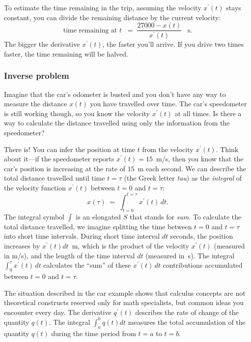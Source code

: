 			To estimate the time remaining in the trip,
			assuming the velocity $x^{\prime\!}(t)$ stays constant,
			you can divide the remaining distance
			by the current velocity:
			\[
				\text{time remaining at } t
					\; \; =\; \frac{ 27000 - x(t) }{ x^{\prime\!}(t) } \;\;\; \textrm{s}.
			\]
			The bigger the derivative $x^{\prime\!}(t)$,
			the faster you'll arrive.
			If you drive two times faster,
			the time remaining will be halved.
	
	
		\subsubsection{Inverse problem}
		\label{introduction:car_inverse_problem}
	
			Imagine that the car's odometer is busted
			and you don't have any way
			to measure the distance $x(t)$ you have travelled over time.
			The car's speedometer is still working though,
			so you know the velocity $x^{\prime\!}(t)$ at all times.
			Is there a way to calculate the distance travelled
			using only the information from the speedometer?

			There is!
			You can infer the position at time $t$ from the velocity $x^{\prime\!}(t)$.
			Think about it---if the speedometer reports $x^{\prime\!}(t)=15$~m/s,
			then you know that the car's position is increasing at the rate of $15$~m each second.
			We can describe the total distance travelled until time $t=\tau$ (the Greek letter \emph{tau})
			as the \emph{integral} of the velocity function $x^{\prime\!}(t)$
			between $t=0$ and $t=\tau$:
			\[
				x(\tau) \; = \; \int_{t=0}^{t=\tau}  x^{\prime\!}(t)\, dt.
			\]
			The integral symbol $\int$ is an elongated $S$ that stands for \emph{sum}.
			To calculate the total distance travelled,
			we imagine splitting the time between $t=0$ and $t=\tau$
			into short time intervals.
			During short time interval $dt$ seconds,
			the position increases by $x^{\prime\!}(t)dt$~m,
			which is the product of the velocity $x^{\prime\!}(t)$ (measured in m/s),
			and the length of the time interval $dt$ (measured in~s).
			The integral $\int_{0}^{\tau}  x^{\prime\!}(t)\, dt$
			calculates the ``sum'' of these $x^{\prime\!}(t)\,dt$ contributions
			accumulated between $t=0$ and $t=\tau$.


	\noindent
	The situation described in the car example
	shows that calculus concepts
	are not theoretical constructs reserved only for math specialists,
	but common ideas you encounter every day.
	The derivative $q^{\prime\!}(t)$ describes the rate of change of the quantity $q(t)$.
	The integral $\int_a^b q(t)dt$ measures the total accumulation of the quantity $q(t)$
	during the time period from $t=a$ to $t=b$.


